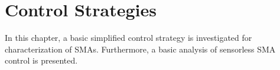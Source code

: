 \chapter{Control Strategies}
In this chapter, a basic simplified control strategy is investigated for characterization of SMAs. Furthermore, a basic analysis of sensorless SMA control is presented.

